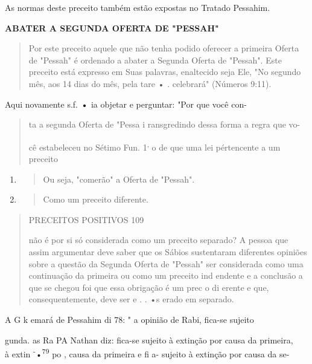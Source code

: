 As normas deste preceito também estão expostas no Tratado Pessahim.

\textbf{ABATER A SEGUNDA OFERTA DE "PESSAH"}

\begin{quote}
Por este preceito aquele que não tenha podido oferecer a primeira Oferta
de "Pessah" é ordenado a abater a Segunda Oferta de "Pessah". Este
preceito está expresso em Suas palavras, enaltecido seja Ele, "No
segundo mês, aos 14 dias do mês, pela tare • . celebrará" (Números
9:11).
\end{quote}

Aqui novamente s.f. \textbf{•} ia objetar e perguntar: "Por que você
con-

\begin{quote}
ta a segunda Oferta de "Pessa i ransgredindo dessa forma a regra que vo-

cê estabeleceu no Sétimo Fun. 1\textsuperscript{,} o de que uma lei
pértencente a um preceito
\end{quote}

\begin{enumerate}
\def\labelenumi{\arabic{enumi}.}
\setcounter{enumi}{75}
\item
  \begin{quote}
  Ou seja, "comerão" a Oferta de "Pessah".
  \end{quote}
\item
  \begin{quote}
  Como um preceito diferente.
  \end{quote}
\end{enumerate}

\begin{quote}
PRECEITOS POSITIVOS 109

não é por si só considerada como um preceito separado? A pessoa que
assim argumentar deve saber que os Sábios sustentaram diferentes
opiniões sobre a questão da Segunda Oferta de "Pessah" ser considerada
como uma continua­ção da primeira ou como um preceito ind endente e a
conclusão a que se che­gou foi que essa obrigação é um prec o di erente
e que, consequentemente, deve ser e . . •s erado em separado.
\end{quote}

A G k emará de Pessahim di 78: " a opinião de Rabi, fica-se sujeito

gunda. as Ra PA Nathan diz: fica-se sujeito à extinção por causa da
primeira,\\
à extin \textsuperscript{-}•\textsuperscript{79} po , causa da primeira
e fi a- sujeito à extinção por causa da se-

